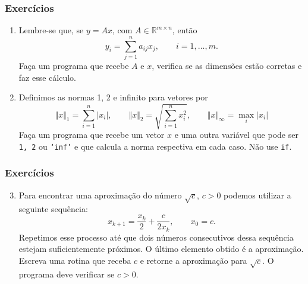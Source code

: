 \documentclass{beamer}
\newcommand{\ssiz}{\scriptsize}
\newcommand{\norma}[1]{\Vert #1 \Vert_2}
\newcommand{\modulo}[1]{\vert #1 \vert}
\begin{document}
\begin{frame}
 \frametitle{Exerc\'icios}
{\ssiz
\begin{enumerate}
\item Lembre-se que, se $y = Ax$, com $A \in \mathbb{R}^{m\times n}$, ent\~ao
$$y_i = \sum_{j = 1}^na_{ij}x_j, \qquad i = 1,\dots,m.$$
Fa\c{c}a um programa que recebe $A$ e $x$, verifica se as dimens\~oes est\~ao corretas e faz esse c\'alculo.
\item Definimos as normas 1, 2 e infinito para vetores por {\ssiz
$$\Vert x\Vert_1 = \sum_{i = 1}^n \modulo{x_i}, \qquad \norma{x} = \sqrt{\sum_{i=1}^nx_i^2}, \qquad \Vert x\Vert_{\infty} = \max_i \modulo{x_i}$$
}
Fa\c{c}a um programa que recebe um vetor $x$ e uma outra vari\'avel que pode ser {\tt 1, 2} ou {\tt `inf'} e que calcula a norma respectiva em cada caso. N\~ao use {\tt if}.
\end{enumerate}
}

\end{frame}


\begin{frame}
\frametitle{Exerc\'icios}

{\ssiz
\begin{enumerate}
\setcounter{enumi}{2}
\item Para encontrar uma aproxima\c{c}\~ao do n\'umero $\sqrt{c}$, $c > 0$ podemos utilizar a seguinte sequ\^encia:
$$x_{k+1} = \frac{x_k}{2} + \frac{c}{2x_k}, \qquad x_0 = c.$$
Repetimos esse processo at\'e que dois n\'umeros consecutivos dessa sequ\^encia estejam suficientemente pr\'oximos. O \'ultimo elemento obtido \'e a aproxima\c{c}\~ao. Escreva uma rotina que receba $c$ e retorne a aproxima\c{c}\~ao para $\sqrt{c}$. O programa deve verificar se $c > 0$.

\end{enumerate}
}

\end{frame}
\end{document}
